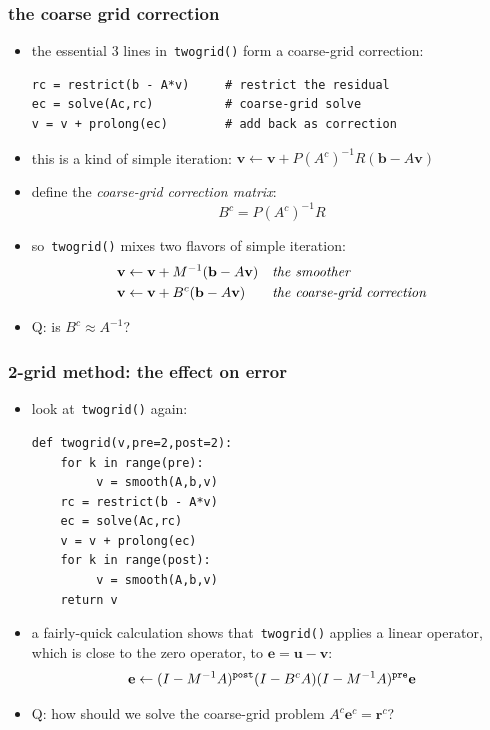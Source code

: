 \documentclass[10pt,
               svgnames,
               hyperref={colorlinks,citecolor=DeepPink4,linkcolor=FireBrick,urlcolor=Maroon},
               usepdftitle=false]{beamer}
\newcommand{\bb}{\mathbf{b}}
\newcommand{\be}{\mathbf{e}}
\newcommand{\br}{\mathbf{r}}
\newcommand{\bu}{\mathbf{u}}
\newcommand{\bv}{\mathbf{v}}
\begin{document}
\begin{frame}[fragile]
\frametitle{the coarse grid correction}
\begin{itemize}
\item the essential 3 lines in \,\texttt{twogrid()} form a \alert{coarse-grid correction}:

\medskip
\begin{verbatim}
rc = restrict(b - A*v)     # restrict the residual
ec = solve(Ac,rc)          # coarse-grid solve
v = v + prolong(ec)        # add back as correction
\end{verbatim}

\smallskip
\item this is a kind of simple iteration: \qquad $\bv \leftarrow \bv + P (A^c)^{-1} R (\bb - A\bv)$
\item define the \emph{coarse-grid correction matrix}:
	$$B^c = P (A^c)^{-1} R$$
\item so \,\texttt{twogrid()} mixes two flavors of simple iteration:
\begin{align*}
\bv &\leftarrow \bv + M^{-1} (\bb - A\bv) &&\text{\emph{the smoother}} \\
\bv &\leftarrow \bv + B^c (\bb - A\bv) &&\text{\emph{the coarse-grid correction}}
\end{align*}

\medskip
\item Q: is $B^c \approx A^{-1}$?  
\end{itemize}
\end{frame}


\begin{frame}[fragile]
\frametitle{2-grid method: the effect on error}
\begin{itemize}
\item look at \,\texttt{twogrid()} again:

\medskip
\begin{verbatim}
def twogrid(v,pre=2,post=2):
    for k in range(pre):
         v = smooth(A,b,v)
    rc = restrict(b - A*v)
    ec = solve(Ac,rc)
    v = v + prolong(ec)
    for k in range(post):
         v = smooth(A,b,v)
    return v
\end{verbatim}

\bigskip
\item a fairly-quick calculation shows that \,\texttt{twogrid()} applies a linear operator, which is \alert{close to the zero operator}, to $\be=\bu-\bv$:
	$$\be \leftarrow (I - M^{-1} A)^{\text{\texttt{post}}} (I - B^c A) (I - M^{-1} A)^{\text{\texttt{pre}}} \be$$

\medskip
\item<2> Q: how should we solve the coarse-grid problem $A^c \be^c = \br^c$?
\end{itemize}
\end{frame}
\end{document}
